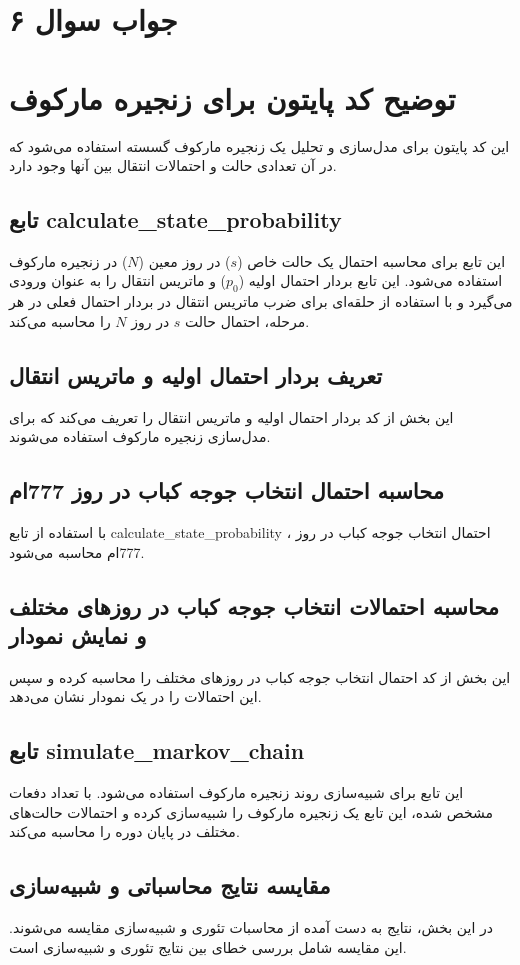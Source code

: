 \section*{جواب سوال ۶}

\section*{توضیح کد پایتون برای زنجیره مارکوف}

این کد پایتون برای مدل‌سازی و تحلیل یک زنجیره مارکوف گسسته استفاده می‌شود که در آن تعدادی حالت و احتمالات انتقال بین آنها وجود دارد.

\subsection*{تابع calculate\_state\_probability}
این تابع برای محاسبه احتمال یک حالت خاص (\(s\)) در روز معین (\(N\)) در زنجیره مارکوف استفاده می‌شود. این تابع بردار احتمال اولیه (\(p_0\)) و ماتریس انتقال را به عنوان ورودی می‌گیرد و با استفاده از حلقه‌ای برای ضرب ماتریس انتقال در بردار احتمال فعلی در هر مرحله، احتمال حالت \(s\) در روز \(N\) را محاسبه می‌کند.

\subsection*{تعریف بردار احتمال اولیه و ماتریس انتقال}
این بخش از کد بردار احتمال اولیه و ماتریس انتقال را تعریف می‌کند که برای مدل‌سازی زنجیره مارکوف استفاده می‌شوند.

\subsection*{محاسبه احتمال انتخاب جوجه کباب در روز 777ام}
با استفاده از تابع calculate\_state\_probability ، احتمال انتخاب جوجه کباب در روز 777ام محاسبه می‌شود.

\subsection*{محاسبه احتمالات انتخاب جوجه کباب در روزهای مختلف و نمایش نمودار}
این بخش از کد احتمال انتخاب جوجه کباب در روزهای مختلف را محاسبه کرده و سپس این احتمالات را در یک نمودار نشان می‌دهد.

\subsection*{تابع simulate\_markov\_chain}
این تابع برای شبیه‌سازی روند زنجیره مارکوف استفاده می‌شود. با تعداد دفعات مشخص شده، این تابع یک زنجیره مارکوف را شبیه‌سازی کرده و احتمالات حالت‌های مختلف در پایان دوره را محاسبه می‌کند.

\subsection*{مقایسه نتایج محاسباتی و شبیه‌سازی}
در این بخش، نتایج به دست آمده از محاسبات تئوری و شبیه‌سازی مقایسه می‌شوند. این مقایسه شامل بررسی خطای بین نتایج تئوری و شبیه‌سازی است.
